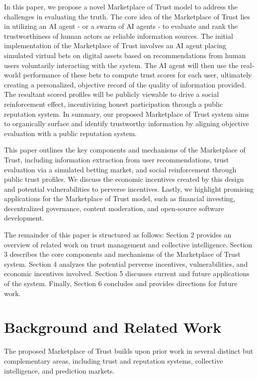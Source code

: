 \documentclass{article}
\begin{document}
In this paper, we propose a novel Marketplace of Trust model to address the challenges in evaluating the truth. The core idea of the Marketplace of Trust lies in utilizing an AI agent - or a swarm of AI agents - to evaluate and rank the trustworthiness of human actors as reliable information sources. The initial implementation of the Marketplace of Trust involves an AI agent placing simulated virtual bets on digital assets based on recommendations from human users voluntarily interacting with the system. The AI agent will then use the real-world performance of these bets to compute trust scores for each user, ultimately creating a personalized, objective record of the quality of information provided. The resultant scored profiles will be publicly viewable to drive a social reinforcement effect, incentivizing honest participation through a public reputation system. In summary, our proposed Marketplace of Trust system aims to organically surface and identify trustworthy information by aligning objective evaluation with a public reputation system.

This paper outlines the key components and mechanisms of the Marketplace of Trust, including information extraction from user recommendations, trust evaluation via a simulated betting market, and social reinforcement through public trust profiles. We discuss the economic incentives created by this design and potential vulnerabilities to perverse incentives. Lastly, we highlight promising applications for the Marketplace of Trust model, such as financial investing, decentralized governance, content moderation, and open-source software development.

The remainder of this paper is structured as follows: Section 2 provides an overview of related work on trust management and collective intelligence. Section 3 describes the core components and mechanisms of the Marketplace of Trust system. Section 4 analyzes the potential perverse incentives, vulnerabilities, and economic incentives involved. Section 5 discusses current and future applications of the system. Finally, Section 6 concludes and provides directions for future work.

\section{ Background and Related Work}

The proposed Marketplace of Trust builds upon prior work in several distinct but complementary areas, including trust and reputation systems, collective intelligence, and prediction markets.
\end{document}

